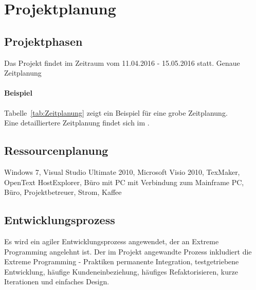 \section{Projektplanung} 
\label{sec:Projektplanung}


\subsection{Projektphasen}
\label{sec:Projektphasen}
Das Projekt findet im Zeitraum vom 11.04.2016 - 15.05.2016 statt.
Genaue Zeitplanung

\paragraph{Beispiel}
Tabelle~\ref{tab:Zeitplanung} zeigt ein Beispiel für eine grobe Zeitplanung.
\\
Eine detailliertere Zeitplanung findet sich im .


\subsection{Ressourcenplanung}
\label{sec:Ressourcenplanung}
Windows 7, Visual Studio Ultimate 2010, Microsoft Visio 2010, TexMaker, OpenText HostExplorer,  Büro mit PC mit Verbindung zum Mainframe
PC, Büro, Projektbetreuer, Strom, Kaffee


\subsection{Entwicklungsprozess}
\label{sec:Entwicklungsprozess}
Es wird ein agiler Entwicklungsprozess angewendet, der an Extreme Programming angelehnt ist. Der im Projekt angewandte Prozess inkludiert die Extreme Programming - Praktiken permanente Integration, testgetriebene Entwicklung, häufige Kundeneinbeziehung, häufiges Refaktorisieren, kurze Iterationen und einfaches Design. 






